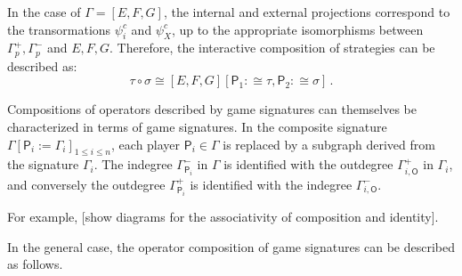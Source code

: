 \documentclass[format=sigplan,authordraft]{acmart}
\newcommand{\kw}[1]{\ensuremath{ \mathsf{#1} }}
\begin{document}
In the case of $\Gamma = [E, F, G]$,
the internal and external projections correspond
to the transormations $\psi^c_i$ and $\psi^c_X$,
up to the appropriate isomorphisms
between $\Gamma^+_p, \Gamma^-_p$ and $E, F, G$.
Therefore,
the interactive composition of strategies
can be described as:
\[
  \tau \circ \sigma \cong
    [E, F, G][\kw{P}_1 :\cong \tau, \kw{P}_2 :\cong \sigma] \,.
\]

Compositions of operators
described by game signatures
can themselves be characterized
in terms of game signatures.
In the composite signature
$\Gamma[\kw{P}_i := \Gamma_i]_{1 \le i \le n}$,
each player $\kw{P}_i \in \Gamma$
is replaced by a subgraph derived from
the signature $\Gamma_i$.
The indegree $\Gamma^-_{\kw{P}_i}$ in $\Gamma$
is identified with the outdegree $\Gamma^+_{i, \kw{O}}$ in $\Gamma_i$,
and conversely
the outdegree $\Gamma^+_{\kw{P}_i}$
is identified with the indegree $\Gamma^-_{i, \kw{O}}$.

For example,
[show diagrams for the associativity of composition
and identity].

In the general case,
the operator composition of game signatures
can be described as follows.
\end{document}
